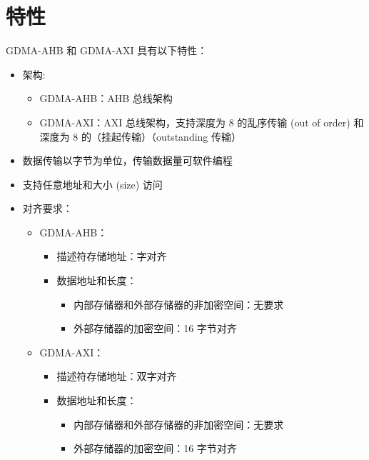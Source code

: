 \documentclass[main\_\_CN.tex]{subfiles}
\begin{document}
\section{特性}

GDMA-AHB 和 GDMA-AXI 具有以下特性：

\begin{itemize}
    \item 架构:
        \begin{itemize}
            \item GDMA-AHB：AHB 总线架构
            \item GDMA-AXI：AXI 总线架构，支持深度为 8 的乱序传输 (out of order) 和深度为 8 的（挂起传输）（outstanding 传输）
        \end{itemize}
    \item 数据传输以字节为单位，传输数据量可软件编程
    \item 支持任意地址和大小 (size) 访问
    \item 对齐要求：
        \begin{itemize}
            \item GDMA-AHB：
                \begin{itemize}
                    \item 描述符存储地址：字对齐
                    \item 数据地址和长度：
                        \begin{itemize}
                            \item 内部存储器和外部存储器的非加密空间：无要求
                            \item 外部存储器的加密空间：16 字节对齐
                        \end{itemize}
                \end{itemize}
            \item GDMA-AXI：
                \begin{itemize}
                    \item 描述符存储地址：双字对齐
                    \item 数据地址和长度：
                        \begin{itemize}
                            \item 内部存储器和外部存储器的非加密空间：无要求
                            \item 外部存储器的加密空间：16 字节对齐
                        \end{itemize}
                \end{itemize}

\end{itemize}
\end{itemize}
\end{document}
